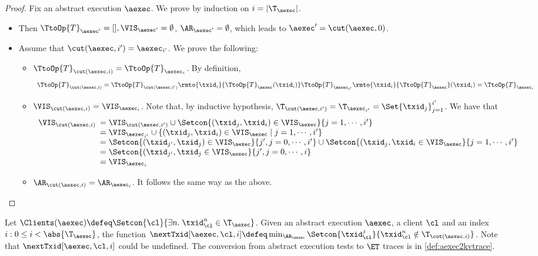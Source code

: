 \begin{proof}
Fix an abstract execution $\aexec$. We prove by induction on $i = \lvert \T_{\aexec} \rvert$.
\begin{itemize}
\item {} Then $\TtoOp{T}_{\aexec'} = [], \VIS_{\aexec'} = \emptyset$, 
$\AR_{\aexec'} = \emptyset$, which leads to $\aexec' = \cut(\aexec, 0)$. 
\item {} 
Assume that $\cut(\aexec, i') = \aexec_{i'}$. 
We prove the following: 
\begin{itemize}
\item $\TtoOp{T}_{\cut(\aexec, i)} = \TtoOp{T}_{\aexec_i}$. 
By definition, 
\[
    \begin{array}{l}
\TtoOp{T}_{\cut(\aexec,i)} = \TtoOp{T}_{\cut(\aexec, i')}\rmto{\txid_{i}}{\TtoOp{T}_{\aexec}(\txid_{i})} 
\TtoOp{T}_{\aexec_{i'}}\rmto{\txid_{i}}{\TtoOp{T}_{\aexec}}(\txid_{i}) = \TtoOp{T}_{\aexec_{i}}
\end{array}
\]
\item $\VIS_{\cut(\aexec, i)} = \VIS_{\aexec_{i}}$. 
Note that, by inductive hypothesis, $\T_{\cut(\aexec, i')} = \T_{\aexec_{i'}} = \Set{\txid_{j}}_{j=1}^{i'}$. 
We have that  
\[
\begin{array}{l}
    \VIS_{\cut(\aexec, i)}
    \begin{array}[t]{l}
    = \VIS_{\cut(\aexec, i')} \cup \Setcon{(\txid_j, \txid_{i}) \in \VIS_{\aexec} }{ j = 1,\cdots, i'} \\ 
    = \VIS_{\aexec_{i'}} \cup \{(\txid_{j}, \txid_{i}) \in \VIS_{\aexec} \mid j=1,\cdots, i'\} \\ 
    = \Setcon{(\txid_{j'}, \txid_{j}) \in \VIS_{\aexec} }{ j', j = 0,\cdots, i'} \cup \Setcon{(\txid_{j}, \txid_{i} \in \VIS_{\aexec} }{ j=1,\cdots, i'} \\
    = \Setcon{(\txid_{j'}, \txid_{j} \in \VIS_{\aexec}  }{ j',j = 0,\cdots, i} \\
    = \VIS_{\aexec_{i}}
    \end{array}
\end{array}
\]
\item $\AR_{\cut(\aexec, i)} = \AR_{\aexec_{i}}$. It follows the same way 
as the above. 
\end{itemize}
\end{itemize}
\end{proof}

Let $\Clients(\aexec) \defeq \Setcon{\cl }{ \exists n.\;\txid_{\cl}^{n} \in \T_{\aexec}}$.
Given an abstract execution $\aexec$, a client $\cl$ and an index $i : 0 \leq i < \abs{\T_\aexec}$,
the function $\nextTxid[\aexec, \cl, i] \defeq \min_{\AR_{\aexec}} \Setcon{\txid_{\cl}^{j} }{ \txid_{\cl}^{n} \notin \T_{\cut(\aexec, i)}}$. 
Note that $\nextTxid[\aexec, \cl, i]$ could be undefined. 
The conversion from abstract execution tests to \( \ET \) traces is in \cref{def:aexec2kvtrace}.

